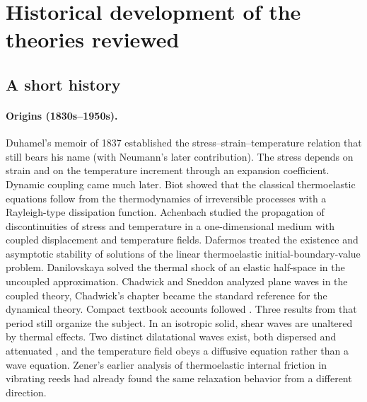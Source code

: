 \section{Historical development of the theories reviewed}\label{sec:history}
\subsection{A short history}
\paragraph{Origins (1830s--1950s).} Duhamel's memoir of 1837 \citep{Duhamel1837} established the stress--strain--temperature relation that still bears his name (with Neumann's later contribution). The stress depends on strain and on the temperature increment through an expansion coefficient. Dynamic coupling came much later. Biot \citep{Biot1956} showed that the classical thermoelastic equations follow from the thermodynamics of irreversible processes with a Rayleigh-type dissipation function. Achenbach \citep{Achenbach1968} studied the propagation of discontinuities of stress and temperature in a one-dimensional medium with coupled displacement and temperature fields. Dafermos \citep{Dafermos1968} treated the existence and asymptotic stability of solutions of the linear thermoelastic initial-boundary-value problem. Danilovskaya \citep{Danilovskaya1950} solved the thermal shock of an elastic half-space in the uncoupled approximation. Chadwick and Sneddon \citep{ChadwickSneddon1958} analyzed plane waves in the coupled theory, Chadwick's chapter \citep{Chadwick1960} became the standard reference for the dynamical theory. Compact textbook accounts followed \citep{Boley1960,Nowacki1975,Carlson1972}. Three results from that period still organize the subject. In an isotropic solid, shear waves are unaltered by thermal effects. Two distinct dilatational waves exist, both dispersed and attenuated \citep{Deresiewicz1957}, and the temperature field obeys a diffusive equation rather than a wave equation. Zener's earlier analysis of thermoelastic internal friction in vibrating reeds \citep{Zener1937} had already found the same relaxation behavior from a different direction.

